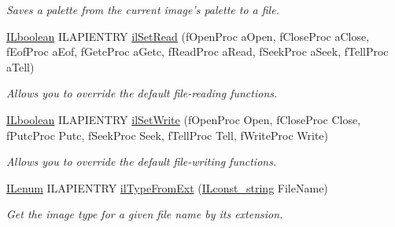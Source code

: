 \begin{DoxyCompactItemize}
\begin{DoxyCompactList}\small\item\em Saves a palette from the current image's palette to a file. \end{DoxyCompactList}\item 
\hypertarget{group__file_ga0da9f7a1b0cb90a147c1aad3f88f1278}{\hyperlink{group__il__types_gaa6aa7c95cfdc06b4d8601ef832b7bb0a}{I\+Lboolean} I\+L\+A\+P\+I\+E\+N\+T\+R\+Y \hyperlink{group__file_ga0da9f7a1b0cb90a147c1aad3f88f1278}{il\+Set\+Read} (f\+Open\+Proc a\+Open, f\+Close\+Proc a\+Close, f\+Eof\+Proc a\+Eof, f\+Getc\+Proc a\+Getc, f\+Read\+Proc a\+Read, f\+Seek\+Proc a\+Seek, f\+Tell\+Proc a\+Tell)}\label{group__file_ga0da9f7a1b0cb90a147c1aad3f88f1278}

\begin{DoxyCompactList}\small\item\em Allows you to override the default file-\/reading functions. \end{DoxyCompactList}\item 
\hypertarget{group__file_ga81425877b333b8d8b7c1cb29033cb4e3}{\hyperlink{group__il__types_gaa6aa7c95cfdc06b4d8601ef832b7bb0a}{I\+Lboolean} I\+L\+A\+P\+I\+E\+N\+T\+R\+Y \hyperlink{group__file_ga81425877b333b8d8b7c1cb29033cb4e3}{il\+Set\+Write} (f\+Open\+Proc Open, f\+Close\+Proc Close, f\+Putc\+Proc Putc, f\+Seek\+Proc Seek, f\+Tell\+Proc Tell, f\+Write\+Proc Write)}\label{group__file_ga81425877b333b8d8b7c1cb29033cb4e3}

\begin{DoxyCompactList}\small\item\em Allows you to override the default file-\/writing functions. \end{DoxyCompactList}\item 
\hypertarget{group__file_gac2f29d0fa616c99f9b44ca5c7175a36a}{\hyperlink{group__il__types_ga62ca73445716183ef42b1f3906a45ed0}{I\+Lenum} I\+L\+A\+P\+I\+E\+N\+T\+R\+Y \hyperlink{group__file_gac2f29d0fa616c99f9b44ca5c7175a36a}{il\+Type\+From\+Ext} (\hyperlink{group__il__types_ga1aa1edc3eb344e14acacb02bade24a5a}{I\+Lconst\+\_\+string} File\+Name)}\label{group__file_gac2f29d0fa616c99f9b44ca5c7175a36a}

\begin{DoxyCompactList}\small\item\em Get the image type for a given file name by its extension. \end{DoxyCompactList}\end{DoxyCompactItemize}


